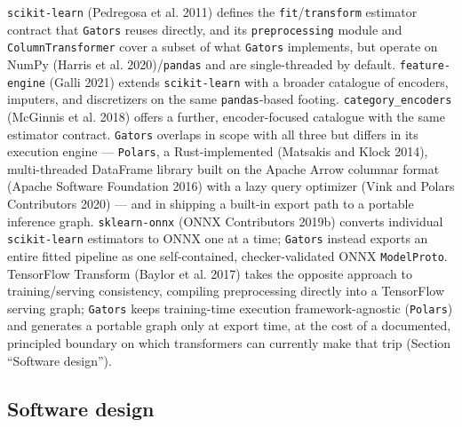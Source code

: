 \documentclass[
]{article}
\begin{document}
\texttt{scikit-learn} (Pedregosa et al. 2011) defines the
\texttt{fit}/\texttt{transform} estimator contract that \texttt{Gators}
reuses directly, and its \texttt{preprocessing} module and
\texttt{ColumnTransformer} cover a subset of what \texttt{Gators}
implements, but operate on NumPy (Harris et al. 2020)/\texttt{pandas}
and are single-threaded by default. \texttt{feature-engine} (Galli 2021)
extends \texttt{scikit-learn} with a broader catalogue of encoders,
imputers, and discretizers on the same \texttt{pandas}-based footing.
\texttt{category\_encoders} (McGinnis et al. 2018) offers a further,
encoder-focused catalogue with the same estimator contract.
\texttt{Gators} overlaps in scope with all three but differs in its
execution engine --- \texttt{Polars}, a Rust-implemented (Matsakis and
Klock 2014), multi-threaded DataFrame library built on the Apache Arrow
columnar format (Apache Software Foundation 2016) with a lazy query
optimizer (Vink and Polars Contributors 2020) --- and in shipping a
built-in export path to a portable inference graph.
\texttt{sklearn-onnx} (ONNX Contributors 2019b) converts individual
\texttt{scikit-learn} estimators to ONNX one at a time; \texttt{Gators}
instead exports an entire fitted pipeline as one self-contained,
checker-validated ONNX \texttt{ModelProto}. TensorFlow Transform (Baylor
et al. 2017) takes the opposite approach to training/serving
consistency, compiling preprocessing directly into a TensorFlow serving
graph; \texttt{Gators} keeps training-time execution framework-agnostic
(\texttt{Polars}) and generates a portable graph only at export time, at
the cost of a documented, principled boundary on which transformers can
currently make that trip (Section ``Software design'').

\subsection{Software design}\label{software-design}
\end{document}
